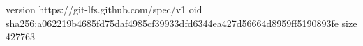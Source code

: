 version https://git-lfs.github.com/spec/v1
oid sha256:a062219b4685fd75daf4985cf39933dfd6344ea427d56664d8959ff5190893fe
size 427763
